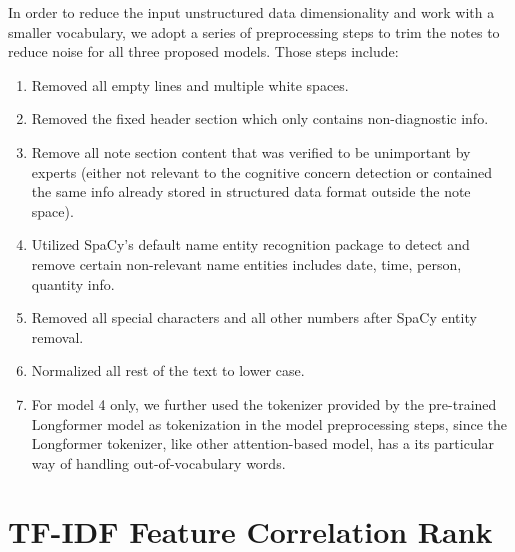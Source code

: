 \documentclass[pmlr,twocolumn]{jmlr} %
\begin{document}
In order to reduce the input unstructured data dimensionality and work with a smaller vocabulary, we adopt a series of preprocessing steps  to trim the notes to reduce noise for all three proposed models. Those steps include:
\begin{enumerate}

 \item Removed all empty lines and multiple white spaces.
 \item Removed the fixed header section which only contains non-diagnostic info. \item Remove all note section content that was verified to be unimportant by experts (either not relevant to the cognitive concern detection or contained the same info already stored in structured data format outside the note space).
 \item Utilized SpaCy's default name entity recognition package to detect and remove certain non-relevant name entities includes date, time, person, quantity info.
 \item Removed all special characters and all other numbers after SpaCy entity removal.
 \item Normalized all rest of the text to lower case.
 \item For model 4 only, we further used the tokenizer provided by the pre-trained Longformer \citep{beltagy2020longformer} model as tokenization in the model preprocessing steps, since the Longformer tokenizer, like other attention-based model, has a its particular way of handling out-of-vocabulary words.
\end{enumerate}



\hfill \break

\section{TF-IDF Feature Correlation Rank}\label{apd:app2}
\end{document}
